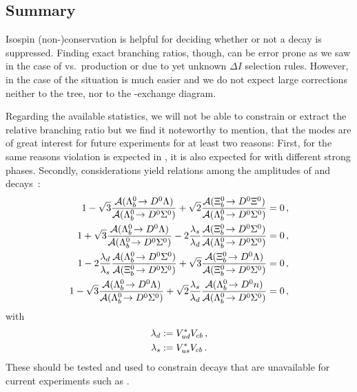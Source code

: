 \subsection{Summary}
Isospin (non-)conservation is helpful for deciding whether or not a decay is suppressed.
Finding exact branching ratios, though, can be error prone as we saw in the case of \Lz\Lbar vs.\ \Sz\Szbar production or due to yet unknown $\Delta I$ selection rules.
However, in the case of \decay{\Lb}{\Dz\Lz} the situation is much easier and we do not expect large corrections neither to the tree, nor to the \W-exchange diagram. 

Regarding the available statistics, we will not be able to constrain or extract the relative branching ratio but we find it noteworthy to mention, that the \Sz modes are of great interest for future experiments for at least two reasons:
First, for the same reasons \CP violation is expected in \decay{\Lb}{\PD\Lz}, it is also expected for \decay{\Lb}{\PD\Sz} with different strong phases.
Secondly, \grpsuthree{} considerations yield relations among the amplitudes of \decay{\Lb}{\Dz\PX} and \decay{\Xibz}{\Dz\PX} decays~\cite{privyuval}:
\begin{align*}
    1 - \sqrt{3} \frac{\mathcal{A}(\decay{\Lb}{\Dz\Lz})}{\mathcal{A}(\decay{\Lb}{\Dz\Sz})} + \sqrt{2} \frac{\mathcal{A}(\decay{\Xibz}{\Dz\Xiz})}{\mathcal{A}(\decay{\Lb}{\Dz\Sz})} &= 0 \,, \\
    1 + \sqrt{3} \frac{\mathcal{A}(\decay{\Lb}{\Dz\Lz})}{\mathcal{A}(\decay{\Lb}{\Dz\Sz})} - 2 \frac{\lambda_s}{\lambda_d} \frac{\mathcal{A}(\decay{\Xibz}{\Dz\Sz})}{\mathcal{A}(\decay{\Lb}{\Dz\Sz})} &= 0 \,, \\
    1 - 2 \frac{\lambda_d}{\lambda_s} \frac{\mathcal{A}(\decay{\Lb}{\Dz\Sz})}{\mathcal{A}(\decay{\Xibz}{\Dz\Sz})} + \sqrt{3} \frac{\mathcal{A}(\decay{\Xibz}{\Dz\Lz})}{\mathcal{A}(\decay{\Xibz}{\Dz\Sz})} &= 0 \,, \\
    1 - \sqrt{3} \frac{\mathcal{A}(\decay{\Lb}{\Dz\Lz})}{\mathcal{A}(\decay{\Lb}{\Dz\Sz})} + \sqrt{2} \frac{\lambda_s}{\lambda_d} \frac{\mathcal{A}(\decay{\Lb}{\Dz\neutron})}{\mathcal{A}(\decay{\Lb}{\Dz\Sz})} &= 0 \,,
\end{align*}
with
\begin{align*}
    \lambda_d &:= {V_{{u}{d}}^\ast}{V_{{c}{b}}} \,, \\
    \lambda_s &:= {V_{{u}{s}}^\ast}{V_{{c}{b}}} \,.
\end{align*}
These should be tested and used to constrain decays that are unavailable for current experiments such as \decay{\Lb}{\Dz\neutron}.

